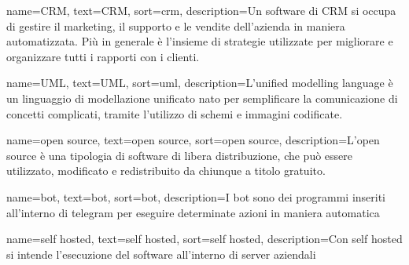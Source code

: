 

%

 {
    name=CRM,
    text=CRM,
    sort=crm,
    description={Un software di CRM si occupa di gestire il marketing, il supporto e le vendite dell'azienda in maniera automatizzata. Più in generale è l'insieme di strategie utilizzate per migliorare e organizzare tutti i rapporti con i clienti.}
}

 {
    name=UML,
    text=UML,
    sort=uml,
    description={L'unified modelling language è un linguaggio di modellazione unificato nato per semplificare la comunicazione di concetti complicati, tramite l'utilizzo di schemi e immagini codificate.}
}

 {
    name=open source,
    text=open source,
    sort=open source,
    description={L'open source è una tipologia di software di libera distribuzione, che può essere utilizzato, modificato e redistribuito da chiunque a titolo gratuito.}
}

 {
    name=bot,
    text=bot,
    sort=bot,
    description={I bot sono dei programmi inseriti all'interno di telegram per eseguire determinate azioni in maniera automatica}
}

 {
    name=self hosted,
    text=self hosted,
    sort=self hosted,
    description={Con self hosted si intende l'esecuzione del software all'interno di server aziendali}
}

